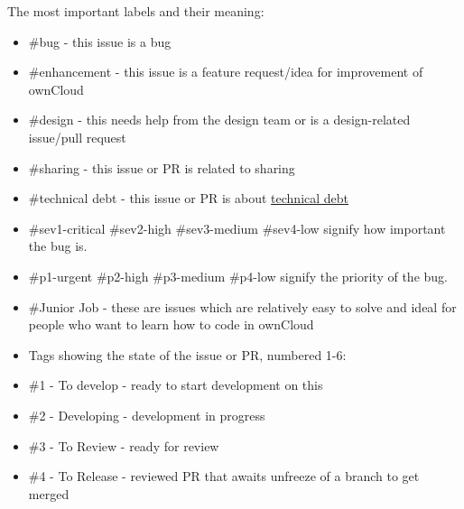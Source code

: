 \documentclass[letterpaper,10pt,english]{sphinxmanual}
\begin{document}
The most important labels and their meaning:
\begin{itemize}
\item {} 
\#bug - this issue is a bug

\item {} 
\#enhancement - this issue is a feature request/idea for improvement of ownCloud

\item {} 
\#design - this needs help from the design team or is a design-related issue/pull request

\item {} 
\#sharing - this issue or PR is related to sharing

\item {} 
\#technical debt - this issue or PR is about \href{http://en.wikipedia.org/wiki/Technical\_debt}{technical debt}

\item {} 
\#sev1-critical \#sev2-high \#sev3-medium \#sev4-low signify how important the bug is.

\item {} 
\#p1-urgent \#p2-high \#p3-medium \#p4-low signify the priority of the bug.

\item {} 
\#Junior Job - these are issues which are relatively easy to solve and ideal for people who want to learn how to code in ownCloud

\item {} 
Tags showing the state of the issue or PR, numbered 1-6:

\end{itemize}
\begin{itemize}
\item {} 
\#1 - To develop - ready to start development on this

\item {} 
\#2 - Developing - development in progress

\item {} 
\#3 - To Review - ready for review

\item {} 
\#4 - To Release - reviewed PR that awaits unfreeze of a branch to get merged

\end{itemize}
\end{document}
